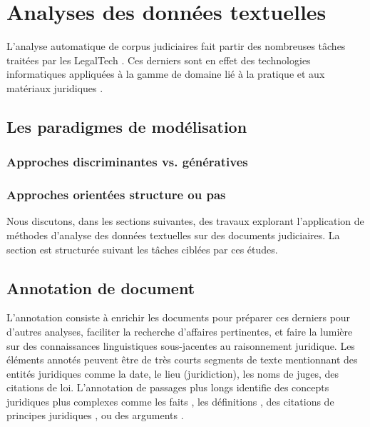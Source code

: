 


\section{Analyses des données textuelles}
\label{sec:literature:legaltal}

L'analyse automatique de corpus judiciaires fait partir des nombreuses tâches traitées par les \og{} LegalTech \fg{}. Ces derniers sont en effet des technologies informatiques appliquées à la gamme de domaine lié à la pratique et aux matériaux juridiques \citep{narazenko2017legalnlpintro}.

\subsection{Les paradigmes de modélisation}

\subsubsection{Approches discriminantes vs. génératives}

\subsubsection{Approches orientées structure ou pas}


Nous discutons, dans les sections suivantes, des travaux explorant l'application de méthodes d'analyse des données textuelles sur des documents judiciaires. La section est structurée suivant les tâches ciblées par ces études.

\subsection{Annotation de document}

L'annotation consiste à enrichir les documents pour préparer ces derniers pour d'autres analyses, faciliter la recherche d'affaires pertinentes, et faire la lumière sur des connaissances linguistiques sous-jacentes au raisonnement juridique. Les éléments annotés peuvent être de très courts segments de texte mentionnant des entités juridiques \citep{Waltl2016lexia, wyner2010extractlegalelts} comme la date, le lieu (juridiction), les noms de juges, des citations de loi.  L'annotation de passages plus longs identifie des concepts juridiques plus complexes comme les faits \citep{wyner2010extractlegalelts, wyner2010casefactors, Shulayeva2017recognfactprincip}, les définitions \citep{Waltl2016lexia}, des citations de principes juridiques \citep{Shulayeva2017recognfactprincip}, ou des arguments \citep{WynerMoens2010mineargument}. 


